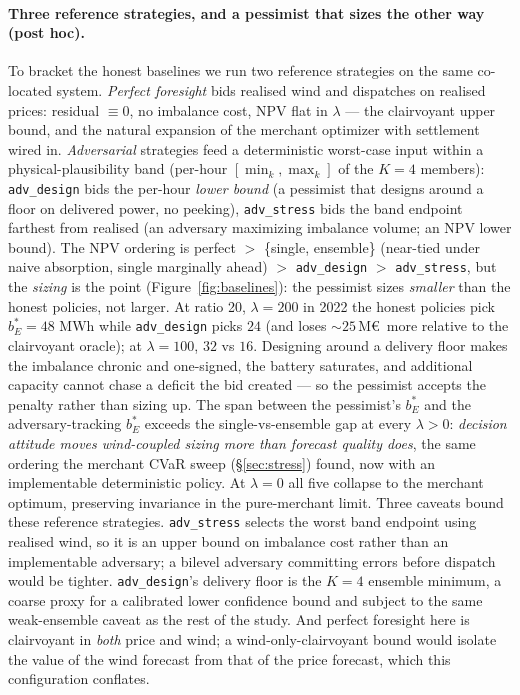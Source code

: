 \documentclass[11pt]{article}
\begin{document}
\paragraph{Three reference strategies, and a pessimist that sizes the other way (post hoc).} To bracket the honest baselines we run two reference strategies on the same co-located system. \emph{Perfect foresight} bids realised wind and dispatches on realised prices: residual $\equiv 0$, no imbalance cost, NPV flat in $\lambda$ --- the clairvoyant upper bound, and the natural expansion of the merchant optimizer with settlement wired in. \emph{Adversarial} strategies feed a deterministic worst-case input within a physical-plausibility band (per-hour $[\min_k, \max_k]$ of the $K{=}4$ members): \texttt{adv\_design} bids the per-hour \emph{lower bound} (a pessimist that designs around a floor on delivered power, no peeking), \texttt{adv\_stress} bids the band endpoint farthest from realised (an adversary maximizing imbalance volume; an NPV lower bound). The NPV ordering is perfect $>$ \{single, ensemble\} (near-tied under naive absorption, single marginally ahead) $>$ \texttt{adv\_design} $>$ \texttt{adv\_stress}, but the \emph{sizing} is the point (Figure~\ref{fig:baselines}): the pessimist sizes \emph{smaller} than the honest policies, not larger. At ratio 20, $\lambda = 200$ in 2022 the honest policies pick $b_E^* = 48$ MWh while \texttt{adv\_design} picks $24$ (and loses $\sim 25$\,M\euro\ more relative to the clairvoyant oracle); at $\lambda = 100$, $32$ vs $16$. Designing around a delivery floor makes the imbalance chronic and one-signed, the battery saturates, and additional capacity cannot chase a deficit the bid created --- so the pessimist accepts the penalty rather than sizing up. The span between the pessimist's $b_E^*$ and the adversary-tracking $b_E^*$ exceeds the single-vs-ensemble gap at every $\lambda > 0$: \emph{decision attitude moves wind-coupled sizing more than forecast quality does}, the same ordering the merchant CVaR sweep (\S\ref{sec:stress}) found, now with an implementable deterministic policy. At $\lambda = 0$ all five collapse to the merchant optimum, preserving invariance in the pure-merchant limit. Three caveats bound these reference strategies. \texttt{adv\_stress} selects the worst band endpoint using realised wind, so it is an upper bound on imbalance cost rather than an implementable adversary; a bilevel adversary committing errors before dispatch would be tighter. \texttt{adv\_design}'s delivery floor is the $K{=}4$ ensemble minimum, a coarse proxy for a calibrated lower confidence bound and subject to the same weak-ensemble caveat as the rest of the study. And perfect foresight here is clairvoyant in \emph{both} price and wind; a wind-only-clairvoyant bound would isolate the value of the wind forecast from that of the price forecast, which this configuration conflates.
\end{document}
